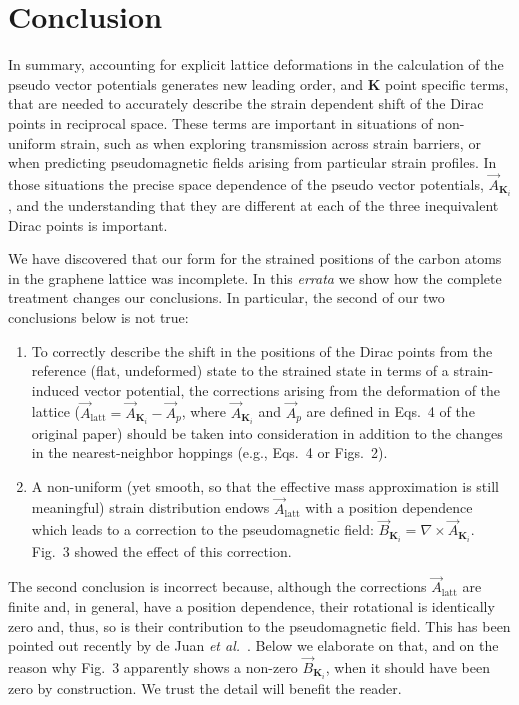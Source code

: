 \section{Conclusion}

In summary, accounting for explicit lattice deformations in the calculation of the pseudo vector potentials generates new leading order, and $\bm{K}$ point specific terms, that are needed to accurately describe the strain dependent shift of the Dirac points in reciprocal space. These terms are important in situations of non-uniform strain, such as when exploring transmission across strain barriers, or when predicting pseudomagnetic fields arising from particular strain profiles.
In those situations the precise space dependence of the pseudo vector potentials, $\vec{A}_{\bm{K}_i}$, and the understanding that they are different at each of the three inequivalent Dirac points is important.

\setlength{\parindent}{0em}
\setlength{\parskip}{1em}


We have discovered that our form for the strained positions of the carbon atoms in the graphene lattice was incomplete. In this \emph{errata} we show how the complete treatment changes our conclusions. In particular, the second of our two conclusions below is not true:
%
\begin{enumerate}
  \item To correctly describe the shift in the positions of the Dirac points from the reference (flat, undeformed) state to the strained state in terms of a strain-induced vector potential, the corrections arising from the deformation of the lattice ($\vec{A}_\text{latt}=\vec{A}_{\bm{K}_i}-\vec{A}_p$, where $\vec{A}_{\bm{K}_i}$ and $\vec{A}_p$ are defined in Eqs.~4 of the original paper) should be taken into consideration in addition to the changes in the nearest-neighbor hoppings (e.g., Eqs.~4 or Figs.~2).
  \item A non-uniform (yet smooth, so that the effective mass approximation is still meaningful) strain distribution endows $\vec{A}_\text{latt}$ with a position dependence which leads to a correction to the pseudomagnetic field: $\vec{B}_{\bm{K}_i} =\nabla\times\vec{A}_{\bm{K}_i}$. Fig.~3 showed the effect of this correction.
\end{enumerate}

The second conclusion is incorrect because, although the corrections $\vec{A}_\text{latt}$ are finite and, in general, have a position dependence, their rotational is identically zero and, thus, so is their contribution to the pseudomagnetic field. This has been pointed out recently by de Juan \emph{et al.}~\cite{DeJuan2013}. Below we elaborate on that, and on the reason why Fig.~3 apparently shows a non-zero $\vec{B}_{\bm{K}_i}$, when it should have been zero by construction. We trust the detail will benefit the reader.

